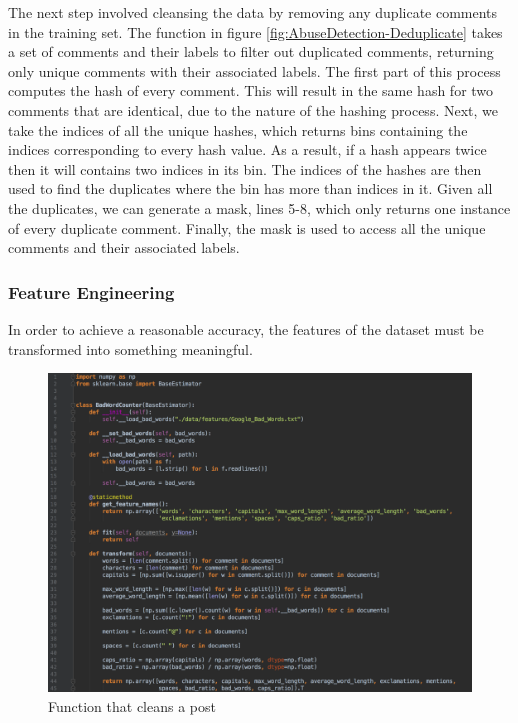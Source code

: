 The next step involved cleansing the data by removing any duplicate comments in the training set. The function in figure \ref{fig:AbuseDetection-Deduplicate} takes a set of comments and their labels to filter out duplicated comments, returning only unique comments with their associated labels. The first part of this process computes the hash of every comment. This will result in the same hash for two comments that are identical, due to the nature of the hashing process. Next, we take the indices of all the unique hashes, which returns bins containing the indices corresponding to every hash value. As a result, if a hash appears twice then it will contains two indices in its bin. The indices of the hashes are then used to find the duplicates where the bin has more than indices in it. Given all the duplicates, we can generate a mask, lines 5-8, which only returns one instance of every duplicate comment. Finally, the mask is used to access all the unique comments and their associated labels.

\subsubsection{Feature Engineering}
In order to achieve a reasonable accuracy, the features of the dataset must be transformed into something meaningful. 


\begin{figure}[H]
	\centering
	\includegraphics[width=\textwidth]{Images/Implementation/DataProcessing/AbuseDetection/BadWordCounter}
	\caption{Function that cleans a post}
	\label{fig:AbuseDetection-BadWordCounter}
\end{figure}

